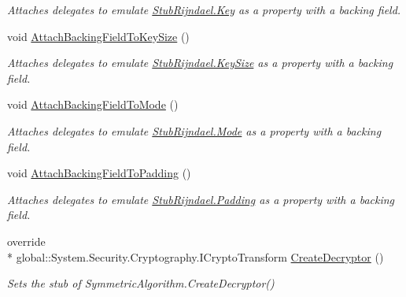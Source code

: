 \begin{DoxyCompactItemize}
\begin{DoxyCompactList}\small\item\em Attaches delegates to emulate \hyperlink{class_system_1_1_security_1_1_cryptography_1_1_fakes_1_1_stub_rijndael_a8365f14cbc433f6142b0cdac2d470f40}{Stub\-Rijndael.\-Key} as a property with a backing field.\end{DoxyCompactList}\item 
void \hyperlink{class_system_1_1_security_1_1_cryptography_1_1_fakes_1_1_stub_rijndael_aca9f1ae1abe1732d7b6a4fa2718114d7}{Attach\-Backing\-Field\-To\-Key\-Size} ()
\begin{DoxyCompactList}\small\item\em Attaches delegates to emulate \hyperlink{class_system_1_1_security_1_1_cryptography_1_1_fakes_1_1_stub_rijndael_adde7919794b7a68f56e8d64f4119559e}{Stub\-Rijndael.\-Key\-Size} as a property with a backing field.\end{DoxyCompactList}\item 
void \hyperlink{class_system_1_1_security_1_1_cryptography_1_1_fakes_1_1_stub_rijndael_ac08e4a0b0daf866767f7bee9aeb2477b}{Attach\-Backing\-Field\-To\-Mode} ()
\begin{DoxyCompactList}\small\item\em Attaches delegates to emulate \hyperlink{class_system_1_1_security_1_1_cryptography_1_1_fakes_1_1_stub_rijndael_a608c5f64bac62e3ae571a15e798bfdb4}{Stub\-Rijndael.\-Mode} as a property with a backing field.\end{DoxyCompactList}\item 
void \hyperlink{class_system_1_1_security_1_1_cryptography_1_1_fakes_1_1_stub_rijndael_a5d1d444b8a8c80cb18600cafa44ec3bb}{Attach\-Backing\-Field\-To\-Padding} ()
\begin{DoxyCompactList}\small\item\em Attaches delegates to emulate \hyperlink{class_system_1_1_security_1_1_cryptography_1_1_fakes_1_1_stub_rijndael_a91b541146be9c20dcf9e593ad73db981}{Stub\-Rijndael.\-Padding} as a property with a backing field.\end{DoxyCompactList}\item 
override \\*
global\-::\-System.\-Security.\-Cryptography.\-I\-Crypto\-Transform \hyperlink{class_system_1_1_security_1_1_cryptography_1_1_fakes_1_1_stub_rijndael_a5e043328c1e0e16b6597db2281dae5d6}{Create\-Decryptor} ()
\begin{DoxyCompactList}\small\item\em Sets the stub of Symmetric\-Algorithm.\-Create\-Decryptor()\end{DoxyCompactList}\item 

\end{DoxyCompactItemize}
